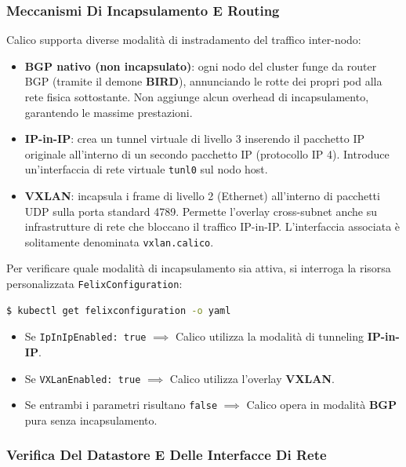 \documentclass[11pt, a4paper]{article}
\begin{document}
\subsubsection{Meccanismi Di Incapsulamento E Routing}

Calico supporta diverse modalità di instradamento del traffico inter-nodo:
\begin{itemize}[noitemsep]
    \item \textbf{BGP nativo (non incapsulato)}: ogni nodo del cluster funge da router BGP (tramite il demone \textbf{BIRD}), annunciando le rotte dei propri pod alla rete fisica sottostante. Non aggiunge alcun overhead di incapsulamento, garantendo le massime prestazioni.
    \item \textbf{IP-in-IP}: crea un tunnel virtuale di livello 3 inserendo il pacchetto IP originale all'interno di un secondo pacchetto IP (protocollo IP 4). Introduce un'interfaccia di rete virtuale \texttt{tunl0} sul nodo host.
    \item \textbf{VXLAN}: incapsula i frame di livello 2 (Ethernet) all'interno di pacchetti UDP sulla porta standard 4789. Permette l'overlay cross-subnet anche su infrastrutture di rete che bloccano il traffico IP-in-IP. L'interfaccia associata è solitamente denominata \texttt{vxlan.calico}.
\end{itemize}

Per verificare quale modalità di incapsulamento sia attiva, si interroga la risorsa personalizzata \texttt{FelixConfiguration}:
\begin{lstlisting}[language=bash]
$ kubectl get felixconfiguration -o yaml
\end{lstlisting}
\begin{itemize}[noitemsep]
    \item Se \texttt{IpInIpEnabled: true} $\implies$ Calico utilizza la modalità di tunneling \textbf{IP-in-IP}.
    \item Se \texttt{VXLanEnabled: true} $\implies$ Calico utilizza l'overlay \textbf{VXLAN}.
    \item Se entrambi i parametri risultano \texttt{false} $\implies$ Calico opera in modalità \textbf{BGP} pura senza incapsulamento.
\end{itemize}

\subsubsection{Verifica Del Datastore E Delle Interfacce Di Rete}
\end{document}
